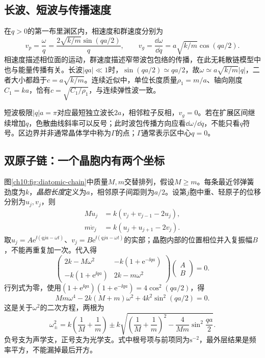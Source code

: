\subsection{长波、短波与传播速度}
在$q>0$的第一布里渊区内，相速度和群速度分别为
\[
 v_p=\frac\omega q=\frac{2\sqrt{k/m}\sin(qa/2)}q,
 \qquad v_g=\frac{\dd\omega}{\dd q}=a\sqrt{k/m}\cos(qa/2).
\]
相速度描述相位面的运动，群速度描述窄带波包包络的传播，在此无耗散链模型中也与能量传播有关。长波$|qa|\ll1$时，$\sin(qa/2)\simeq qa/2$，故$\omega\simeq a\sqrt{k/m}|q|$，二者大小都趋于$c=a\sqrt{k/m}$。连续近似中，单位长度质量$\rho_1=m/a$、轴向刚度$C_1=ka$，恰有$c=\sqrt{C_1/\rho_1}$，与连续弹性波一致。

短波极限$|q|a=\pi$对应最短独立波长$2a$，相邻粒子反相，$v_g=0$。若在扩展区间继续增加$q$，色散曲线斜率可以反号；此时波包传播方向应看$\dd\omega/\dd q$，不能只看$q$符号。区边界并非通常晶体学中称为$\Gamma$的点；$\Gamma$通常表示区中心$q=0$。

\subsection{双原子链：一个晶胞内有两个坐标}
图\ref{ch10:fig:diatomic-chain}中质量$M,m$交替排列，假设$M\geq m$。每条最近邻弹簧劲度为$k$，\emph{晶胞长度}定义为$a$，相邻原子间距则为$a/2$。设第$j$胞中重、轻原子的位移分别为$u_j,v_j$，则
\begin{align}
 M\ddot u_j&=k(v_j+v_{j-1}-2u_j),\label{ch10:eq:diatomic-M}\\
 m\ddot v_j&=k(u_j+u_{j+1}-2v_j).\label{ch10:eq:diatomic-m}
\end{align}
\chTenDiatomicChainFigure
取$u_j=A\mathrm e^{\ii(qja-\omega t)}$、$v_j=B\mathrm e^{\ii(qja-\omega t)}$的实部；晶胞内部的位置相位并入复振幅$B$，不能再重复加一次。代入得
\[
 \begin{pmatrix}
 2k-M\omega^2&-k(1+\mathrm e^{-\ii qa})\\
 -k(1+\mathrm e^{\ii qa})&2k-m\omega^2
 \end{pmatrix}\begin{pmatrix}A\\B\end{pmatrix}=0.
\]
行列式为零，使用$(1+\mathrm e^{\ii qa})(1+\mathrm e^{-\ii qa})=4\cos^2(qa/2)$，得
\[
 Mm\omega^4-2k(M+m)\omega^2+4k^2\sin^2(qa/2)=0.
\]
这是关于$\omega^2$的二次方程，两根为
\begin{equation}\label{ch10:eq:diatomic-dispersion}
 \omega_\pm^2=k\left(\frac1M+\frac1m\right)
 \pm k\sqrt{\left(\frac1M+\frac1m\right)^2-
 \frac4{Mm}\sin^2\frac{qa}{2}}.
\end{equation}
负号支为声学支，正号支为光学支。式中根号项与前项同为$\mathrm{s^{-2}}$，最外层结果是频率平方，不能漏掉最后开方。

